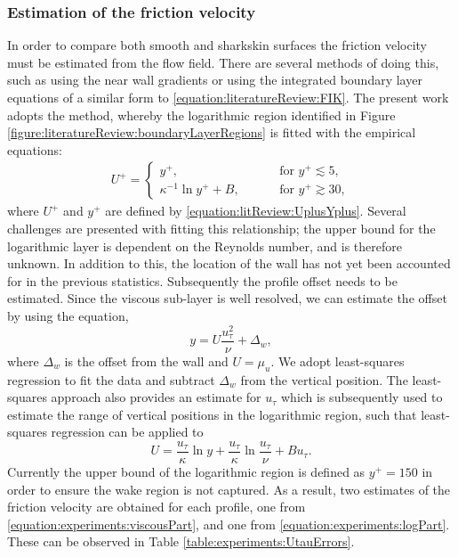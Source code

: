 \documentclass[12pt,oneside,a4paper]{article}
\begin{document}
\subsubsection*{Estimation of the friction velocity}
In order to compare both smooth and sharkskin surfaces the friction velocity must be estimated from the flow field. There are several methods of doing this, such as using the near wall gradients or using the integrated boundary layer equations of a similar form to \eqref{equation:literatureReview:FIK}. The present work adopts the \cite{clauser1956} method, whereby the logarithmic region identified in Figure \ref{figure:literatureReview:boundaryLayerRegions} is fitted with the empirical equations:
\begin{align}
U^+ = \begin{cases}	
y^+, \hspace{1cm} &\text{for } y^+ \lesssim 5,\\
\kappa^{-1} \ln{y^+} + B, \hspace{1cm} &\text{for } y^+ \gtrsim 30,
\end{cases}
\end{align}
where $U^+$ and $y^+$ are defined by \eqref{equation:litReview:UplusYplus}. Several challenges are presented with fitting this relationship; the upper bound for the logarithmic layer is dependent on the Reynolds number, and is therefore unknown. In addition to this, the location of the wall has not yet been accounted for in the previous statistics. Subsequently the profile offset needs to be estimated. Since the viscous sub-layer is well resolved, we can estimate the offset by using the equation,
\begin{equation}
\label{equation:experiments:viscousPart}
y = U\frac{u_\tau^2}{\nu} + \Delta_w,
\end{equation}
where $\Delta_w$ is the offset from the wall and $U = \mu_u$. We adopt least-squares regression to fit the data and subtract $\Delta_w$ from the vertical position. The least-squares approach also provides an estimate for $u_\tau$ which is subsequently used to estimate the range of vertical positions in the logarithmic region, such that least-squares regression can be applied to
\begin{equation}
\label{equation:experiments:logPart}
U = \frac{u_\tau}{\kappa} \ln{y} + \frac{u_\tau}{\kappa}\ln{\frac{u_\tau}{\nu}} + Bu_\tau.
\end{equation}
Currently the upper bound of the logarithmic region is defined as $y^+ = 150$ in order to ensure the wake region is not captured. As a result, two estimates of the friction velocity are obtained for each profile, one from \eqref{equation:experiments:viscousPart}, and one from \eqref{equation:experiments:logPart}. These can be observed in Table \ref{table:experiments:UtauErrors}.
\end{document}
